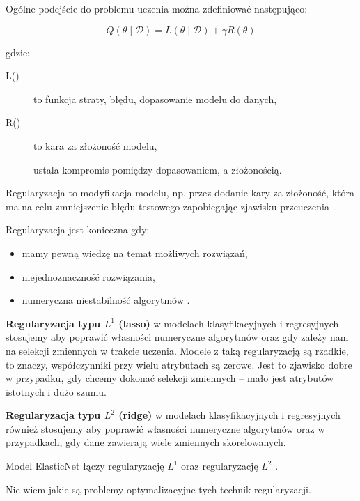 \documentclass[wi]{zut}
\begin{document}
Ogólne podejście do problemu uczenia można zdefiniować następująco:

\begin{equation}
    Q(\theta \mid \mathscr{D})=L(\theta \mid \mathscr{D})+\gamma R(\theta)
\end{equation}

gdzie:

\begin{description}
\item[L(\theta \mid {})] to funkcja straty, błędu, dopasowanie modelu do danych,
\item[R(\theta)] to kara za złożoność modelu,
\item[\gamma] ustala kompromis pomiędzy dopasowaniem, a złożonością.
\end{description}

Regularyzacja to modyfikacja modelu, np. przez dodanie kary za złożoność, która ma na celu zmniejszenie błędu testowego zapobiegając zjawisku przeuczenia \cite{wiki:Regularization}.

Regularyzacja jest konieczna gdy:

\begin{itemize}
    \item mamy pewną wiedzę na temat możliwych rozwiązań,
    \item niejednoznaczność rozwiązania,
    \item numeryczna niestabilność algorytmów \cite{Korzen2020_12}.
\end{itemize}
\question

\textbf{Regularyzacja typu $L^1$ (lasso)} w modelach klasyfikacyjnych i regresyjnych stosujemy aby poprawić własności numeryczne algorytmów oraz gdy zależy nam na selekcji zmiennych w trakcie uczenia. Modele z taką regularyzacją są rzadkie, to znaczy, współczynniki przy wielu atrybutach są zerowe. Jest to zjawisko dobre w przypadku, gdy chcemy dokonać selekcji zmiennych -- mało jest atrybutów istotnych i dużo szumu.

\textbf{Regularyzacja typu $L^2$ (ridge)} w modelach klasyfikacyjnych i regresyjnych również stosujemy aby poprawić własności numeryczne algorytmów oraz w przypadkach, gdy dane zawierają wiele zmiennych skorelowanych.

Model ElasticNet łączy regularyzację $L^1$ oraz regularyzację $L^2$ \cite{wiki:Elastic_net_regularization}. 

Nie wiem jakie są problemy optymalizacyjne tych technik regularyzacji.
\question
\end{document}
